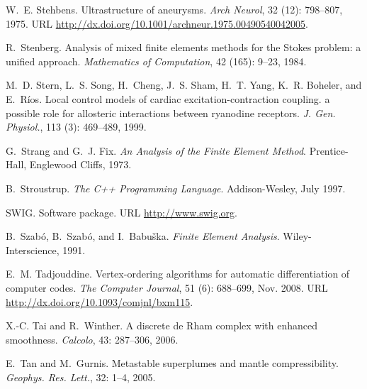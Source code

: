 \begin{thebibliography}{467}
W.~E. Stehbens.
\newblock Ultrastructure of aneurysms.
\newblock \emph{Arch Neurol}, 32 (12): 798--807, 1975.
\newblock URL \url{http://dx.doi.org/10.1001/archneur.1975.00490540042005}.

R.~Stenberg.
\newblock Analysis of mixed finite elements methods for the {S}tokes problem: a
  unified approach.
\newblock \emph{Mathematics of Computation}, 42 (165): 9--23,
  1984.

M.~D. Stern, L.~S. Song, H.~Cheng, J.~S. Sham, H.~T. Yang, K.~R. Boheler, and
  E.~R\'{i}os.
\newblock Local control models of cardiac excitation-contraction coupling. a
  possible role for allosteric interactions between ryanodine receptors.
\newblock \emph{J. Gen. Physiol.}, 113 (3): 469--489, 1999.

G.~Strang and G.~J. Fix.
\newblock \emph{An Analysis of the Finite Element Method}.
\newblock Prentice-Hall, Englewood Cliffs, 1973.

B.~Stroustrup.
\newblock \emph{The {C++} Programming Language}.
\newblock Addison-Wesley, July 1997.

SWIG.
\newblock Software package.
\newblock URL \url{http://www.swig.org}.

B.~Szab{\'o}, B.~Szab{\'o}, and I.~Babu\v{s}ka.
\newblock \emph{Finite Element Analysis}.
\newblock Wiley-Interscience, 1991.

E.~M. Tadjouddine.
\newblock Vertex-ordering algorithms for automatic differentiation of computer
  codes.
\newblock \emph{The Computer Journal}, 51 (6): 688--699, Nov.
  2008.
\newblock URL \url{http://dx.doi.org/10.1093/comjnl/bxm115}.

X.-C. Tai and R.~Winther.
\newblock A discrete de {R}ham complex with enhanced smoothness.
\newblock \emph{Calcolo}, 43: 287--306, 2006.

E.~Tan and M.~Gurnis.
\newblock Metastable superplumes and mantle compressibility.
\newblock \emph{Geophys. Res. Lett.}, 32: 1--4, 2005.


\end{thebibliography}
